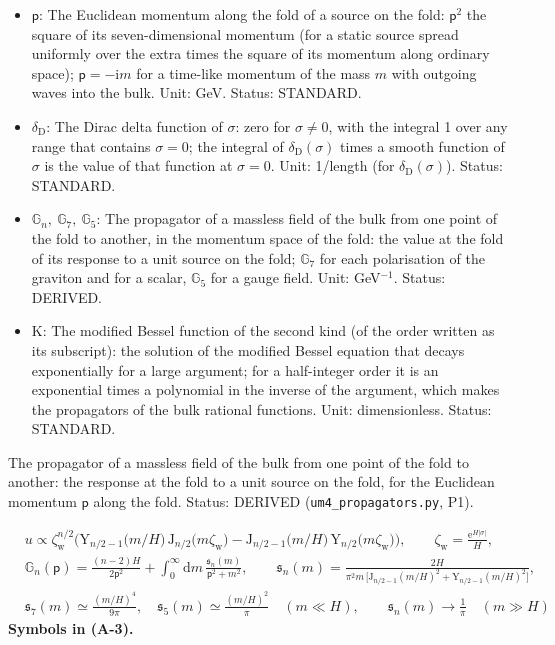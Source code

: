 \documentclass[
  10pt,
]{article}
\begin{document}
\begin{itemize}
  Unit: dimensionless (a relative amplitude); length in a propagator.
  Status: DERIVED.
\item
  \(\mathsf{p}\): The Euclidean momentum along the fold of a source on
  the fold: \(\mathsf{p}^2\) the square of its seven-dimensional
  momentum (for a static source spread uniformly over the extra times
  the square of its momentum along ordinary space);
  \(\mathsf{p} = -\mathrm{i}m\) for a time-like momentum of the mass
  \(m\) with outgoing waves into the bulk. Unit: GeV. Status: STANDARD.
\item
  \(\delta_{\mathrm{D}}\): The Dirac delta function of \(\sigma\): zero
  for \(\sigma \ne 0\), with the integral 1 over any range that contains
  \(\sigma = 0\); the integral of \(\delta_{\mathrm{D}}(\sigma)\) times
  a smooth function of \(\sigma\) is the value of that function at
  \(\sigma = 0\). Unit: 1/length (for \(\delta_{\mathrm{D}}(\sigma)\)).
  Status: STANDARD.
\item
  \(\mathbb{G}_n,\ \mathbb{G}_7,\ \mathbb{G}_5\): The propagator of a
  massless field of the bulk from one point of the fold to another, in
  the momentum space of the fold: the value at the fold of its response
  to a unit source on the fold; \(\mathbb{G}_7\) for each polarisation
  of the graviton and for a scalar, \(\mathbb{G}_5\) for a gauge field.
  Unit: GeV\(^{-1}\). Status: DERIVED.
\item
  \(\mathrm{K}\): The modified Bessel function of the second kind (of
  the order written as its subscript): the solution of the modified
  Bessel equation that decays exponentially for a large argument; for a
  half-integer order it is an exponential times a polynomial in the
  inverse of the argument, which makes the propagators of the bulk
  rational functions. Unit: dimensionless. Status: STANDARD.
\end{itemize}

The propagator of a massless field of the bulk from one point of the
fold to another: the response at the fold to a unit source on the fold,
for the Euclidean momentum \(\mathsf{p}\) along the fold. Status:
DERIVED (\texttt{um4\_propagators.py}, P1).

\[
\begin{aligned}
&u \propto \zeta_{\mathrm{w}}^{n/2}\Big(\mathrm{Y}_{n/2-1}\big(m/H\big)\,\mathrm{J}_{n/2}\big(m\zeta_{\mathrm{w}}\big) - \mathrm{J}_{n/2-1}\big(m/H\big)\,\mathrm{Y}_{n/2}\big(m\zeta_{\mathrm{w}}\big)\Big),\qquad
 \zeta_{\mathrm{w}} = \frac{\mathrm{e}^{H\lvert\sigma\rvert}}{H},\\
&\mathbb{G}_n(\mathsf{p}) = \frac{(n - 2)H}{2\mathsf{p}^2} + \int_0^\infty\mathrm{d}m\,\frac{\mathfrak{s}_n(m)}{\mathsf{p}^2 + m^2},\qquad
 \mathfrak{s}_n(m) = \frac{2H}{\pi^2m\,\big[\mathrm{J}_{n/2-1}(m/H)^2 + \mathrm{Y}_{n/2-1}(m/H)^2\big]},\\
&\mathfrak{s}_7(m) \simeq \frac{(m/H)^4}{9\pi},\quad \mathfrak{s}_5(m) \simeq \frac{(m/H)^2}{\pi}\quad(m \ll H),\qquad \mathfrak{s}_n(m) \to \frac{1}{\pi}\quad(m \gg H)
\end{aligned} \tag{A-3}
\] \textbf{Symbols in (A-3).}
\end{document}
